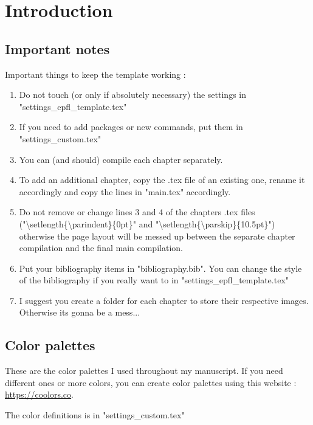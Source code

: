 \documentclass[../main.tex]{subfiles}
\begin{document}
\cleardoublepage
\chapter{Introduction}

\section{Important notes}
Important things to keep the template working :
\begin{enumerate}
    \item Do not touch (or only if absolutely necessary) the settings in "settings\_epfl\_template.tex" 
    \item If you need to add packages or new commands, put them in "settings\_custom.tex"
    \item You can (and should) compile each chapter separately.
    \item To add an additional chapter, copy the .tex file of an existing one, rename it accordingly and copy the lines in "main.tex" accordingly.
    \item Do not remove or change lines 3 and 4 of the chapters .tex files ("\textbackslash setlength\{\textbackslash parindent\}\{0pt\}" and "\textbackslash setlength\{\textbackslash parskip\}\{10.5pt\}") otherwise the page layout will be messed up between the separate chapter compilation and the final main compilation.
    \item Put your bibliography items in "bibliography.bib". You can change the style of the bibliography if you really want to in "settings\_epfl\_template.tex"
    \item I suggest you create a folder for each chapter to store their respective images. Otherwise its gonna be a mess...
\end{enumerate}

\section{Color palettes}
These are the color palettes I used throughout my manuscript. If you need different ones or more colors, you can create color palettes using this website : \href{https://coolors.co/generate}{https://coolors.co}.

The color definitions is in "settings\_custom.tex"
\end{document}
